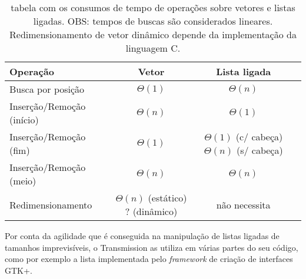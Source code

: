 \begin{table}
    \centering
    \begin{tabular}{| l | c | c | c |}
        \hline
        \textbf{Operação} & \textbf{Vetor} & \textbf{Lista ligada} \\
        \hline
        Busca por posição & $\Theta(1)$ & $\Theta(n)$ \\
        \hline
        Inserção/Remoção (início) & $\Theta(n)$ & $\Theta(1)$ \\
        \hline
        Inserção/Remoção (fim) & $\Theta(1)$ & \parbox[t]{.3\textwidth}{\centering $\Theta(1)$ (c/ cabeça) \\ $\Theta(n)$ (s/ cabeça)} \\
        \hline
        Inserção/Remoção (meio) & $\Theta(n)$ & $\Theta(n)$ \\
        \hline
        Redimensionamento & \parbox[t]{.25\textwidth}{\centering $\Theta(n)$ (estático) \\ ? (dinâmico)} & não necessita \\
        \hline
    \end{tabular}
    \caption{tabela com os consumos de tempo de operações sobre vetores e listas
    ligadas. OBS: tempos de buscas são considerados lineares. Redimensionamento de vetor
    dinâmico depende da implementação da linguagem C.}
\end{table}

Por conta da agilidade que é conseguida na manipulação de listas ligadas de tamanhos
imprevisíveis, o Transmission as utiliza em várias partes do seu código, como por
exemplo a lista implementada pelo \emph{framework} de criação de interfaces GTK+.